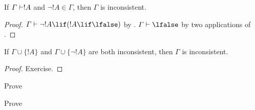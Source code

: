 \documentclass[../../../include/open-logic-section]{subfiles}
\begin{document}
\begin{prop}
  If $\Gamma \Proves !A$ and $\lnot !A \in \Gamma$, then $\Gamma$ is
  inconsistent.
\end{prop}

\begin{proof}
  $\Gamma \Proves \lnot !A \lif (!A \lif \lfalse)$ by .
  $\Gamma \Proves \lfalse$ by two applications of .
\end{proof}


\begin{prop}
  If $\Gamma \cup \{!A\}$ and $\Gamma \cup \{\lnot !A\}$ are both
  inconsistent, then $\Gamma$ is inconsistent.
\end{prop}

\begin{proof}
Exercise.
\end{proof}

\begin{prob}
  Prove 
\end{prob}
\tagendprob

\begin{prob}
  Prove 
\end{prob}
\tagendprob
\end{document}
